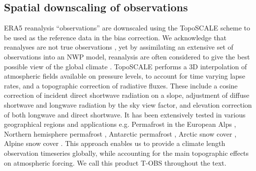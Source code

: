\documentclass[hess, manuscript]{copernicus}
\begin{document}
\subsection{Spatial downscaling of observations}
ERA5 reanalysis \citep{Hersbach2020-ze} “observations” are downscaled using the TopoSCALE scheme \citep{Fiddes2014-wt} to be used as the reference data in the bias correction. We acknowledge that reanalyses are not true observations \citep{Parker2016-qq}, yet by assimilating an extensive set of observations into an NWP model, reanalysis are often considered to give the best possible view of the global climate \cite{Dee2014-de}. TopoSCALE performs a 3D interpolation of atmospheric fields available on pressure levels, to account for time varying lapse rates, and a topographic correction of radiative fluxes. These include a cosine correction of incident direct shortwave radiation on a slope, adjustment of diffuse shortwave and longwave radiation by the sky view factor, and elevation correction of both longwave and direct shortwave. It has been extensively tested in various geographical regions and applications e.g. Permafrost in the European Alps \citep{Fiddes2015-lx}, Northern hemisphere permafrost \citep{tc-9-1303-2015}, Antarctic permafrost \citep{Obu2020-ai}, Arctic snow cover \citep{Aalstad2018-vq}, Alpine snow cover \citep{Fiddes2019-vy}. This approach enables us to provide a climate length observation timeseries globally, while accounting for the main topographic effects on atmospheric forcing. We call this product T-OBS throughout the text.



\end{document}
